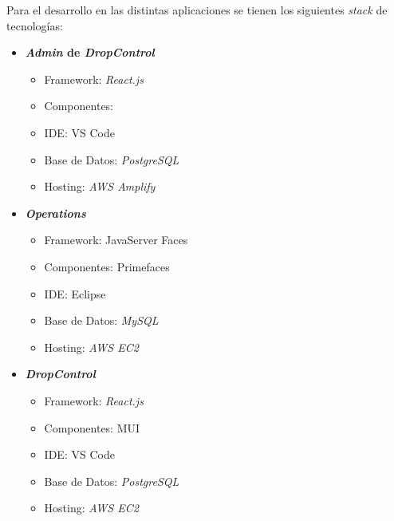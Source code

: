 Para el desarrollo en las distintas aplicaciones se tienen los siguientes \textit{stack} de tecnologías:

\begin{itemize}
    \item \textbf{\textit{Admin} de \textit{DropControl}}
    \begin{itemize}
        \item Framework: \textit{React.js}
        \item Componentes: 
        \item IDE: VS Code
        \item Base de Datos: \textit{PostgreSQL}
        \item Hosting: \textit{AWS Amplify}
    \end{itemize}
    \item \textbf{\textit{Operations}}
    \begin{itemize}
        \item Framework: JavaServer Faces
        \item Componentes: Primefaces
        \item IDE: Eclipse
        \item Base de Datos: \textit{MySQL}
        \item Hosting: \textit{AWS EC2}
    \end{itemize}
    \item \textbf{\textit{DropControl}}
    \begin{itemize}
        \item Framework: \textit{React.js}
        \item Componentes: MUI
        \item IDE: VS Code
        \item Base de Datos: \textit{PostgreSQL}
        \item Hosting: \textit{AWS EC2}
    \end{itemize}
    \iffalse\item \textbf{\textit{SETUP}}
    \begin{itemize}
        \item Framework: JavaServer Faces, Primefaces
        \item IDE: Eclipse
        \item Base de Datos: \textit{PostgreSQL}
        \item Hosting: \textit{AWS EC2}
    \end{itemize}\fi
\end{itemize}

